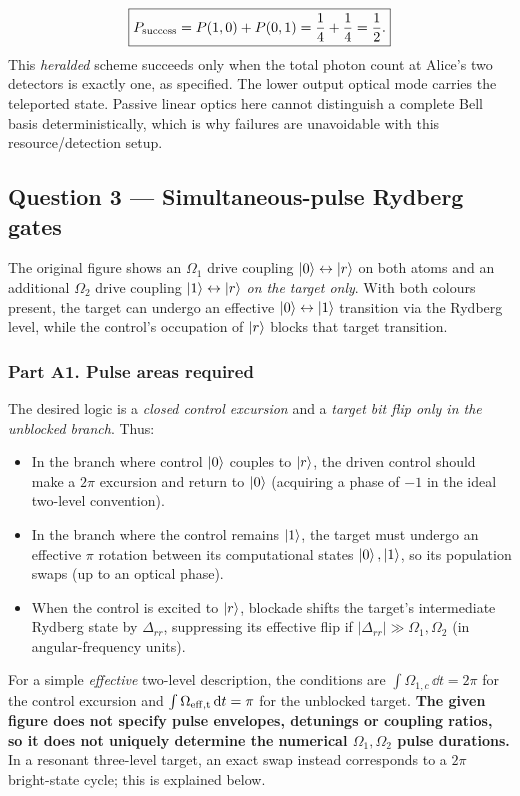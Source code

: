 \begin{equation}\boxed{P_{\rm success}=P(1,0)+P(0,1)=\frac14+\frac14=\frac12.}\end{equation}
This \emph{heralded} scheme succeeds only when the total photon count at Alice's two detectors is exactly one, as specified. The lower output optical mode carries the teleported state. Passive linear optics here cannot distinguish a complete Bell basis deterministically, which is why failures are unavoidable with this resource/detection setup.

\subsection{Question 3 --- Simultaneous-pulse Rydberg gates}
The original figure shows an $\Omega_1$ drive coupling $\left\lvert 0\right\rangle\leftrightarrow\left\lvert r\right\rangle$ on both atoms and an additional $\Omega_2$ drive coupling $\left\lvert 1\right\rangle\leftrightarrow\left\lvert r\right\rangle$ \emph{on the target only}. With both colours present, the target can undergo an effective $\left\lvert 0\right\rangle\leftrightarrow\left\lvert 1\right\rangle$ transition via the Rydberg level, while the control's occupation of $\left\lvert r\right\rangle$ blocks that target transition.

\subsubsection*{Part A1. Pulse areas required}
The desired logic is a \emph{closed control excursion} and a \emph{target bit flip only in the unblocked branch}. Thus:
\begin{itemize}
\item In the branch where control $\left\lvert 0\right\rangle$ couples to $\left\lvert r\right\rangle$, the driven control should make a $2\pi$ excursion and return to $\left\lvert 0\right\rangle$ (acquiring a phase of $-1$ in the ideal two-level convention).
\item In the branch where the control remains $\left\lvert 1\right\rangle$, the target must undergo an effective $\pi$ rotation between its computational states $\left\lvert 0\right\rangle,\left\lvert 1\right\rangle$, so its population swaps (up to an optical phase).
\item When the control is excited to $\left\lvert r\right\rangle$, blockade shifts the target's intermediate Rydberg state by $\Delta_{rr}$, suppressing its effective flip if $|\Delta_{rr}|\gg\Omega_1,\Omega_2$ (in angular-frequency units).
\end{itemize}
For a simple \emph{effective} two-level description, the conditions are $\int\Omega_{1,c}\,\dd t=2\pi$ for the control excursion and $\int\Omega_{\rm eff,t}\,\mathrm{d} t=\pi$ for the unblocked target. \textbf{The given figure does not specify pulse envelopes, detunings or coupling ratios, so it does not uniquely determine the numerical $\Omega_1,\Omega_2$ pulse durations.} In a resonant three-level target, an exact swap instead corresponds to a $2\pi$ bright-state cycle; this is explained below.

